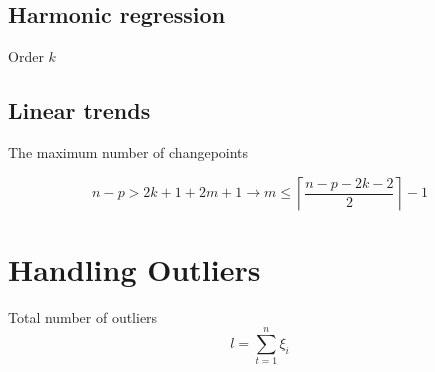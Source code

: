 \documentclass[12pt]{article}
\begin{document}
\subsection{Harmonic regression}

Order $k$ 


\subsection{Linear trends}
The maximum number of changepoints

\[
n - p > 2k + 1 + 2m + 1 
\rightarrow m \leq \left\lceil \frac{n - p - 2k - 2}{2} \right\rceil- 1
\]

\section{Handling Outliers}

Total number of outliers
\[
l = \sum_{t=1}^n \xi_i
\]



%

 

{\small
\singlespacing

%


}
%
%
%
%
%
\end{document}
